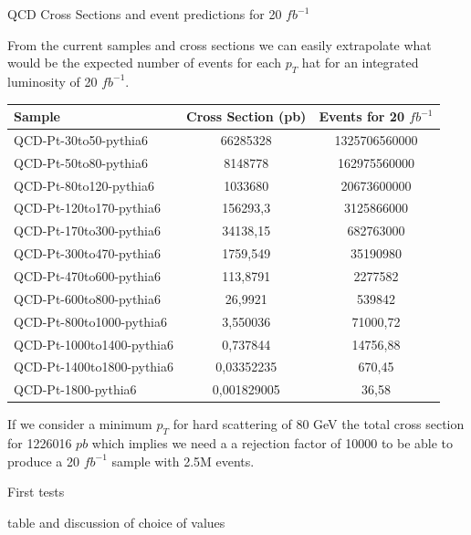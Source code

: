 \documentclass[8pt]{beamer}
\begin{document}
\begin{frame}{QCD Cross Sections and event predictions for 20 $fb^{-1}$}

From the current samples and cross sections we can easily extrapolate what would be the expected
number of events for each $p_T$ hat for an integrated luminosity of 20 $fb^{-1}$.

\begin{block}

\centering
\begin{tabular}{|l||c|c|}
\hline
\hline \hline
Sample & Cross Section (pb) & Events for 20 $fb^{-1}$ \\
\hline \hline
QCD-Pt-30to50-pythia6     & 66285328    & 1325706560000 \\
QCD-Pt-50to80-pythia6     & 8148778     & 162975560000 \\
QCD-Pt-80to120-pythia6    & 1033680     & 20673600000 \\
QCD-Pt-120to170-pythia6   & 156293,3    & 3125866000 \\
QCD-Pt-170to300-pythia6   & 34138,15    & 682763000 \\
QCD-Pt-300to470-pythia6   & 1759,549    & 35190980 \\
QCD-Pt-470to600-pythia6   & 113,8791    & 2277582 \\
QCD-Pt-600to800-pythia6   & 26,9921     & 539842 \\
QCD-Pt-800to1000-pythia6  & 3,550036    & 71000,72 \\
QCD-Pt-1000to1400-pythia6 & 0,737844    & 14756,88 \\
QCD-Pt-1400to1800-pythia6 & 0,03352235  & 670,45 \\
QCD-Pt-1800-pythia6       & 0,001829005 & 36,58 \\
\hline
\end{tabular}

\end{block}

If we consider a minimum $p_T$ for hard scattering of 80 GeV the total cross section for 1226016 $pb$ which
implies we need a a rejection factor of 10000 to be able to produce a 20 $fb^{-1}$ sample with 2.5M 
events.

\end{frame}

\begin{frame}{First tests}
 
table and discussion of choice of values
 
\end{frame}
\end{document}

